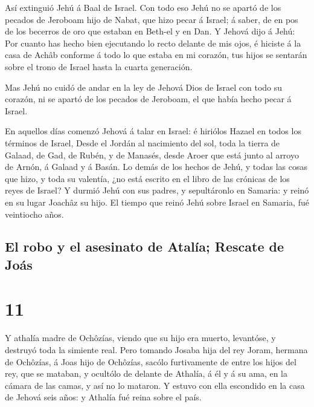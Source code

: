  Así extinguió Jehú á Baal de Israel.  Con
todo eso Jehú no se apartó de los pecados de Jeroboam hijo de Nabat, que
hizo pecar á Israel; á saber, de en pos de los becerros de oro que
estaban en Beth-el y en Dan.  Y Jehová dijo á Jehú: Por
cuanto has hecho bien ejecutando lo recto delante de mis ojos, é hiciste
á la casa de Achâb conforme á todo lo que estaba en mi corazón, tus
hijos se sentarán sobre el trono de Israel hasta la cuarta generación.

 Mas Jehú no cuidó de andar en la ley de Jehová Dios de
Israel con todo su corazón, ni se apartó de los pecados de Jeroboam, el
que había hecho pecar á Israel.

 En aquellos días comenzó Jehová á talar en Israel: é
hiriólos Hazael en todos los términos de Israel,  Desde el
Jordán al nacimiento del sol, toda la tierra de Galaad, de Gad, de
Rubén, y de Manasés, desde Aroer que está junto al arroyo de Arnón, á
Galaad y á Basán.  Lo demás de los hechos de Jehú, y todas
las cosas que hizo, y toda su valentía, ¿no está escrito en el libro de
las crónicas de los reyes de Israel?  Y durmió Jehú con sus
padres, y sepultáronlo en Samaria: y reinó en su lugar Joachâz su hijo.
 El tiempo que reinó Jehú sobre Israel en Samaria, fué
veintiocho años.

\hypertarget{el-robo-y-el-asesinato-de-ataluxeda-rescate-de-jouxe1s}{%
\subsection{El robo y el asesinato de Atalía; Rescate de
Joás}\label{el-robo-y-el-asesinato-de-ataluxeda-rescate-de-jouxe1s}}

\hypertarget{section-10}{%
\section{11}\label{section-10}}

 Y athalía madre de Ochôzías, viendo que su hijo era muerto,
levantóse, y destruyó toda la simiente real.  Pero tomando
Josaba hija del rey Joram, hermana de Ochôzías, á Joas hijo de Ochôzías,
sacólo furtivamente de entre los hijos del rey, que se mataban, y
ocultólo de delante de Athalía, á él y á su ama, en la cámara de las
camas, y así no lo mataron.  Y estuvo con ella escondido en
la casa de Jehová seis años: y Athalía fué reina sobre el país.

